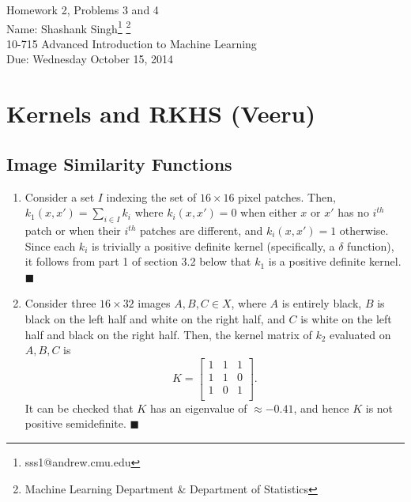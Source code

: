\documentclass[11pt]{article}
\makeatletter
\newcommand{\myname}{Shashank Singh\footnote{sss1@andrew.cmu.edu}
        \footnote{Machine Learning Department \& Department of Statistics}}
\newcommand{\myclass}{10-715 Advanced Introduction to Machine Learning}
\newcommand{\myhwnum}{2}
\newcommand{\duedate}{Wednesday October 15, 2014}
\renewcommand{\qed}{\quad \ensuremath{\blacksquare}}
\makeatother
\begin{document}
\newpage
\setcounter{footnote}{0}
{\Large Homework \myhwnum, Problems 3 and 4} \\
Name: \myname \\
\myclass \\
Due: \duedate

\section{Kernels and RKHS (Veeru)}
\subsection{Image Similarity Functions}
\begin{enumerate}
\item Consider a set $I$ indexing the set of $16 \times 16$ pixel patches.
Then, $k_1(x,x') = \sum_{i \in I} k_i$
where $k_i(x,x') = 0$ when either $x$ or $x'$ has no $i^{th}$ patch or when
their $i^{th}$ patches are different, and $k_i(x,x') = 1$ otherwise. Since each
$k_i$ is trivially a positive definite kernel (specifically, a $\delta$
function), it follows from part 1 of section 3.2 below that $k_1$ is a positive
definite kernel. \qed
\item Consider three $16 \times 32$ images $A,B,C \in X$, where $A$ is entirely
black, $B$ is black on the left half and white on the right half, and $C$ is
white on the left half and black on the right half. Then, the kernel matrix of
$k_2$ evaluated on $A,B,C$ is
\[K =
\begin{bmatrix}
  1 & 1 & 1 \\
  1 & 1 & 0 \\
  1 & 0 & 1 \\
\end{bmatrix}.
\]
It can be checked that $K$ has an eigenvalue of $\approx -0.41$, and hence $K$
is not positive semidefinite. \qed
\end{enumerate}
\end{document}
